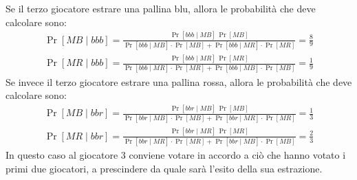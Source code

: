 \begin{description}
    Se il terzo giocatore estrare una pallina blu, allora le probabilità che deve calcolare sono:
    \begin{align*}
        \Pr[MB \mid bbb] = \frac{\Pr[bbb\mid MB]\,\Pr[MB]}{\Pr[bbb \mid MB] \cdot \Pr[MB] + \Pr[bbb \mid MR] \cdot \Pr[MR]} = \frac{8}{9} \\[0.5cm]
        \Pr[MR \mid bbb] = \frac{\Pr[bbb\mid MR]\,\Pr[MR]}{\Pr[bbb \mid MR] \cdot \Pr[MR] + \Pr[bbb \mid MB] \cdot \Pr[MB]} = \frac{1}{9}
    \end{align*}
    Se invece il terzo giocatore estrare una pallina rossa, allora le probabilità che deve calcolare sono:
    \begin{align*}
        \Pr[MB \mid bbr] = \frac{\Pr[bbr\mid MB]\,\Pr[MB]}{\Pr[bbr \mid MB] \cdot \Pr[MB] + \Pr[bbr \mid MR] \cdot \Pr[MR]} = \frac{1}{3} \\[0.5cm]
        \Pr[MR \mid bbr] = \frac{\Pr[bbr\mid MR]\,\Pr[MR]}{\Pr[bbr \mid MR] \cdot \Pr[MR] + \Pr[bbr \mid MB] \cdot \Pr[MB]} = \frac{2}{3}
    \end{align*}
    In questo caso al giocatore 3 conviene votare in accordo a ciò che hanno votato i primi due giocatori, a prescindere da quale sarà l'esito della sua estrazione.
    \item[Giocatore 4:] 
\end{description}